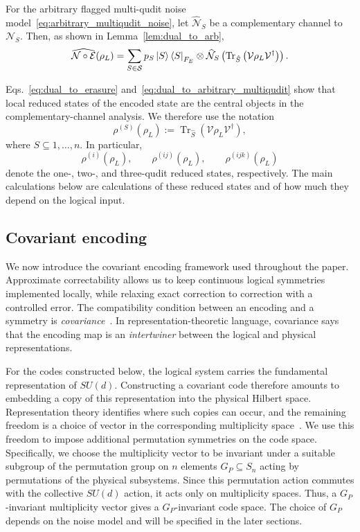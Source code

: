 \documentclass[10pt,twocolumn,superscriptaddress,aps,amsmath,amssymb,citeautoscript,floatfix,prx]{revtex4-2}
\theoremstyle{plain}
\theoremstyle{plain}
\theoremstyle{plain}
\theoremstyle{plain}
\theoremstyle{plain}
\theoremstyle{plain}
\theoremstyle{plain}
\theoremstyle{definition}
\theoremstyle{plain}
\begin{document}
For the arbitrary flagged multi-qudit noise model~\eqref{eq:arbitrary_multiqudit_noise}, let $\widehat{\mathcal N}_S$ be a complementary channel to $\mathcal N_S$. 
Then, as shown in Lemma~\ref{lem:dual_to_arb},
\begin{equation}\label{eq:dual_to_arbitrary_multiqudit}
\widehat{\mathcal N\circ\mathcal E}(\rho_L)
=
\sum_{S\in\mathcal S}
p_S
\ket S\bra S_{F_E}
\otimes
\widehat{\mathcal N}_S
\left(
\operatorname{Tr}_{\hat S}
\left(
\mathcal{V}\rho_L\mathcal{V}^\dagger
\right)
\right).
\end{equation}

Eqs.~\eqref{eq:dual_to_erasure} and~\eqref{eq:dual_to_arbitrary_multiqudit} show that local reduced states of the encoded state are the central objects in the complementary-channel analysis. 
We therefore use the notation
\begin{equation}\label{eq:reduced_state}
\rho^{(S)}(\rho_L)
:=
\operatorname{Tr}_{\hat S}
\left(
\mathcal{V}\rho_L\mathcal{V}^\dagger
\right),
\end{equation}
where $S\subseteq{1,\ldots,n}$. In particular,
$$
\rho^{(i)}(\rho_L),
\qquad
\rho^{(ij)}(\rho_L),
\qquad
\rho^{(ijk)}(\rho_L)
$$
denote the one-, two-, and three-qudit reduced states, respectively. The main calculations below are calculations of these 
reduced states and of how much they depend on the logical input.

\subsection{Covariant encoding}\label{subsec:main_covar_enc}

We now introduce the covariant encoding framework used throughout the paper. Approximate correctability allows us to keep 
continuous logical symmetries implemented locally, while relaxing exact correction to correction with a controlled error. 
The compatibility condition between an encoding and a symmetry is \textit{covariance}~\cite{Hayden2021}. 
In representation-theoretic language, covariance says that the encoding map is an \textit{intertwiner} between the logical and physical representations.

For the codes constructed below, the logical system carries the fundamental representation of $SU(d)$. 
Constructing a covariant code therefore amounts to embedding a copy of this representation into the physical Hilbert space. 
Representation theory identifies where such copies can occur, and the remaining freedom is a choice of vector in the corresponding multiplicity 
space~\cite{Denys2024}. We use this freedom to impose additional permutation symmetries on the code space. 
Specifically, we choose the multiplicity vector to be invariant under a suitable subgroup of the permutation group on $n$ elements $G_P\subseteq S_n$ 
acting by permutations of the physical subsystems. Since this permutation action commutes with the collective $SU(d)$ action, 
it acts only on multiplicity spaces. Thus, a $G_P$-invariant multiplicity vector gives a $G_P$-invariant code space. 
The choice of $G_P$ depends on the noise model and will be specified in the later sections.
\end{document}
